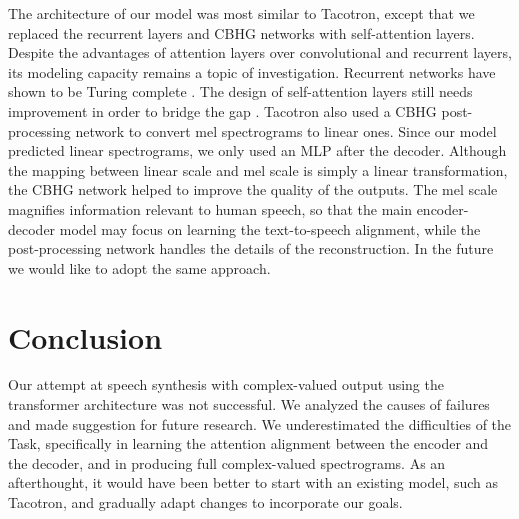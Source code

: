 \documentclass[11pt]{article}
\begin{document}

The architecture of our model was most similar to Tacotron,
except that we replaced the recurrent layers and CBHG networks with self-attention layers.
Despite the advantages of attention layers over convolutional and recurrent layers,
its modeling capacity remains a topic of investigation.
Recurrent networks have shown to be Turing complete \parencite{siegelmann1995computational}.
The design of self-attention layers still needs improvement in order to bridge the gap
\parencite{dehghani2018universal}.
Tacotron also used a CBHG post-processing network to convert mel spectrograms
to linear ones.
Since our model predicted linear spectrograms,
we only used an MLP after the decoder.
Although the mapping between linear scale and mel scale is simply a linear transformation,
the CBHG network helped to improve the quality of the outputs.
The mel scale magnifies information relevant to human speech,
so that the main encoder-decoder model may focus on learning the text-to-speech alignment,
while the post-processing network handles the details of the reconstruction.
In the future we would like to adopt the same approach.

\section{Conclusion}\label{sec:conclusion}

Our attempt at speech synthesis with complex-valued output
using the transformer architecture was not successful.
We analyzed the causes of failures and made suggestion for future research.
We underestimated the difficulties of the Task,
specifically in learning the attention alignment between the encoder and the decoder,
and in producing full complex-valued spectrograms.
As an afterthought, it would have been better to start with an existing model,
such as Tacotron, and gradually adapt changes to incorporate our goals.

\printbibliography[]
\end{document}
